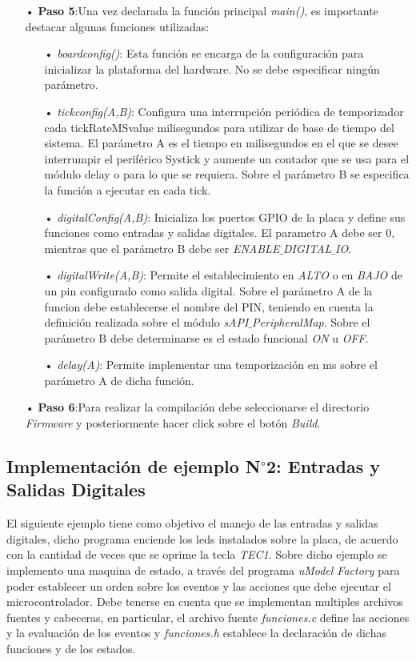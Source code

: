 \documentclass[12pt,letterpaper]{article}
\begin{document}
\begin{enumerate}
\item[•]\textbf{Paso 5}:Una vez declarada la función principal \textit{main()}, es importante destacar algunas funciones utilizadas:
\begin{enumerate}
\item[•]\textit{boardconfig()}: Esta función se encarga de la configuración para inicializar la plataforma del hardware. No se debe especificar ningún parámetro.
\item[•]\textit{tickconfig(A,B)}: Configura una interrupción periódica de temporizador cada tickRateMSvalue milisegundos para utilizar de base de tiempo del sistema. El parámetro A es el tiempo en milisegundos en el que se desee interrumpir el periférico Systick y aumente un contador que se usa para el módulo delay o para lo que se requiera. Sobre el parámetro B se especifica la función a ejecutar en cada tick.
\item[•]\textit{digitalConfig(A,B)}: Inicializa los puertos GPIO de la placa y define sus funciones como entradas y salidas digitales. El parametro A debe ser 0, mientras que el parámetro B debe ser \textit{ENABLE$\_$DIGITAL$\_$IO}.
\item[•]\textit{digitalWrite(A,B)}: Permite el establecimiento en \textit{ALTO} o en \textit{BAJO} de un pin configurado como salida digital. Sobre el parámetro A de la funcion debe establecerse el nombre del PIN, teniendo en cuenta la definición realizada sobre el módulo \textit{sAPI$\_$PeripheralMap}. Sobre el parámetro B debe determinarse es el estado funcional \textit{ON} u \textit{OFF}.
\item[•]\textit{delay(A)}: Permite implementar una temporización en ms sobre el parámetro A de dicha función.
\end{enumerate}

\item[•]\textbf{Paso 6}:Para realizar la compilación debe seleccionarse el directorio \textit{Firmware} y posteriormente hacer click sobre el botón \textit{Build}.
\end{enumerate}
\subsection{Implementación de ejemplo N$^{\circ}$2: Entradas y Salidas Digitales}\label{sec:ej2sapi}

El siguiente ejemplo tiene como objetivo el manejo de las entradas y salidas digitales, dicho programa enciende los leds instalados sobre la placa, de acuerdo con la cantidad de veces que se oprime la tecla \textit{TEC1}. Sobre dicho ejemplo se implemento una maquina de estado, a través del programa \textit{uModel Factory} para poder establecer un orden sobre los eventos y las acciones que debe ejecutar el microcontrolador. Debe tenerse en cuenta que se implementan multiples archivos fuentes y cabeceras, en particular, el archivo fuente \textit{funciones.c} define las acciones y la evaluación de los eventos y \textit{funciones.h} establece la declaración de dichas funciones y de los estados.
 \\
 
\end{document}
